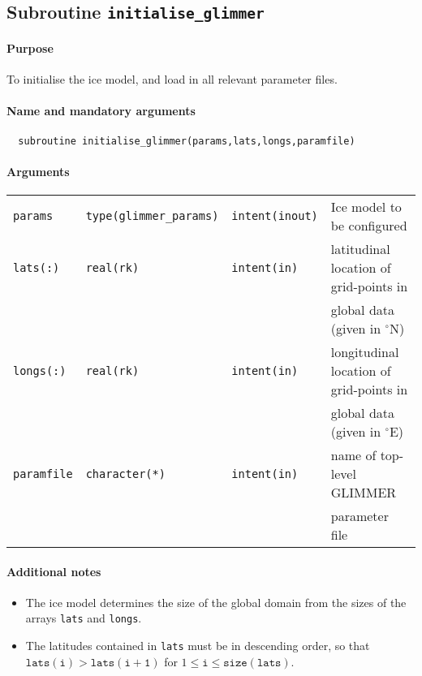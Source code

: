 \subsection{Subroutine \texttt{initialise\_glimmer}}
%
\paragraph{Purpose} To initialise the ice model, and load in all relevant parameter files.
%
\paragraph{Name and mandatory arguments}
%
\begin{verbatim}
  subroutine initialise_glimmer(params,lats,longs,paramfile)
\end{verbatim}
%
\paragraph{Arguments}
%
\begin{center}
\begin{tabular}{llll}
\texttt{params}    & \texttt{type(glimmer\_params)} & \texttt{intent(inout)} &
Ice model to be configured \\
\texttt{lats(:)}   & \texttt{real(rk)} & \texttt{intent(in)} & latitudinal location of grid-points in \\
 & & & global data (given in $^{\circ}\mathrm{N}$)\\
\texttt{longs(:)}  & \texttt{real(rk)} & \texttt{intent(in)} & longitudinal location of grid-points in \\
 & & & global data (given in $^{\circ}\mathrm{E}$)\\
\texttt{paramfile} & \texttt{character(*)} & \texttt{intent(in)} & name of
top-level GLIMMER \\
 & & & parameter file \\
\end{tabular}
\end{center}
%
\paragraph{Additional notes}
%
\begin{itemize}
\item The ice model determines the size of the global domain from the sizes of
  the arrays \texttt{lats} and \texttt{longs}.
\item The latitudes contained in \texttt{lats} must be in descending order, so
  that $\mathtt{lats(i)}>\mathtt{lats(i+1)}$ for $1\leq \mathtt{i} \leq
  \mathtt{size(lats)}$.
\end{itemize}
%
